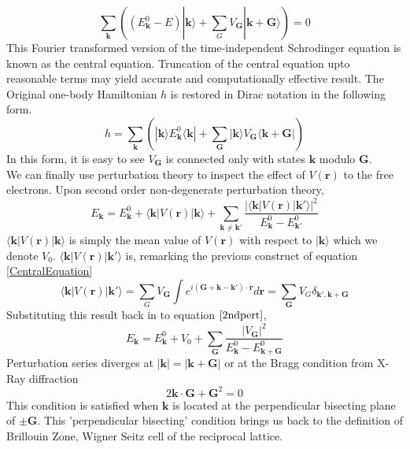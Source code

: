 \documentclass{article}
\begin{document}
\begin{equation}
	\sum_{\mathbf{k}}\left((E_{\mathbf{k}}^{0}-E)|\mathbf{k}\rangle+\sum_{G}V_{\mathbf{G}}|\mathbf{k+G}\rangle\right)=0 \label{CentralEquation}
\end{equation}
This Fourier transformed version of the time-independent Schrodinger equation is known as the central equation. Truncation of the central equation upto reasonable terms may yield accurate and computationally effective result.
The Original one-body Hamiltonian $h$ is restored in Dirac notation in the following form.
\begin{equation}
	h=\sum_{\mathbf{k}}\left(|\mathbf{k}\rangle E_{\mathbf{k}}^{0}\langle\mathbf{k}|+\sum_{\mathbf{G}}|\mathbf{k}\rangle V_{\mathbf{G}}\langle\mathbf{k+G}|\right)\label{hindirac}
\end{equation}
In this form, it is easy to see $V_{\mathbf{G}}$ is connected only with states $\mathbf{k}$ modulo $\mathbf{G}$.\\
We can finally use perturbation theory to inspect the effect of $V(\mathbf{r})$ to the free electrons. Upon second order non-degenerate perturbation theory,
\begin{equation}
	E_{\mathbf{k}}=E_{\mathbf{k}}^{0}+\langle\mathbf{k}|V(\mathbf{r})|\mathbf{k}\rangle+\sum_{\mathbf{k}\neq\mathbf{k'}}\frac{|\langle\mathbf{k}|V(\mathbf{r})|\mathbf{k'}\rangle|^{2}}{E_{\mathbf{k}}^{0}-E_{\mathbf{k'}}^{0}}\label{2ndpert}
\end{equation}
$\langle\mathbf{k}|V(\mathbf{r})|\mathbf{k}\rangle$ is simply the mean value of $V(\mathbf{r})$ with respect to $|\mathbf{k}\rangle$ which we denote $V_0$. $\langle\mathbf{k}|V(\mathbf{r})|\mathbf{k'}\rangle$ is, remarking the previous construct of equation \eqref{CentralEquation}
$$\langle\mathbf{k}|V(\mathbf{r})|\mathbf{k'}\rangle=\sum_{G}V_{\mathbf{G}}\int e^{i(\mathbf{G+\mathbf{k}-\mathbf{k'}})\cdot\mathbf{r}}d\mathbf{r}=\sum_{\mathbf{G}}V_{G}\delta_{\mathbf{k'},\mathbf{k+G}}$$
Substituting this result back in to equation $\eqref{2ndpert}$,
$$E_{\mathbf{k}}=E_{\mathbf{k}}^{0}+V_{0}+\sum_{\mathbf{G}}\frac{|V_{\mathbf{G}}|^{2}}{E_{\mathbf{k}}^{0}-E_{\mathbf{k+G}}^{0}}$$
Perturbation series diverges at $|\mathbf{k}|=|\mathbf{k}+\mathbf{G}|$ or at the Bragg condition from X-Ray diffraction
\begin{equation}
	2\mathbf{k}\cdot\mathbf{G}+\mathbf{G}^2=0\label{Bragg}
\end{equation}
This condition is satisfied when $\mathbf{k}$ is located at the perpendicular bisecting plane of $\pm\mathbf{G}$. This 'perpendicular bisecting' condition brings us back to the definition of Brillouin Zone, Wigner Seitz cell of the reciprocal lattice. \\%
\end{document}
